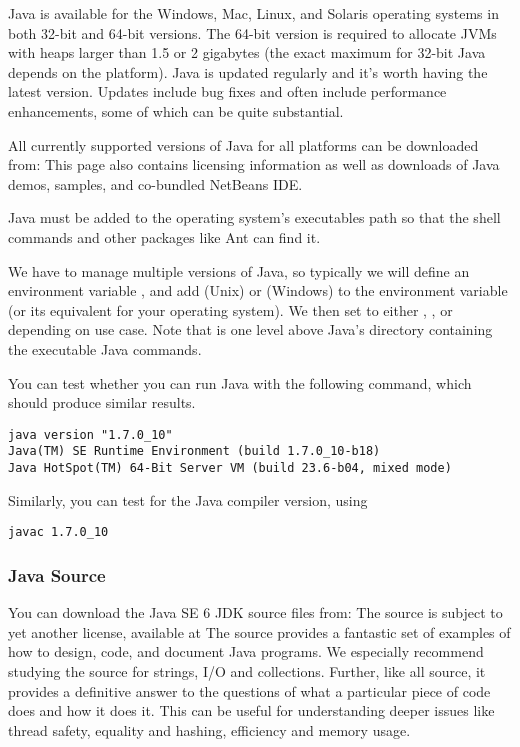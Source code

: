 Java is available for the Windows, Mac, Linux, and Solaris operating
systems in both 32-bit and 64-bit versions.
The 64-bit version
is required to allocate JVMs with heaps larger than 1.5 or 2 gigabytes
(the exact maximum for 32-bit Java depends on the platform).  
Java is updated regularly and it's worth having the latest version.
Updates include bug fixes and often include performance enhancements,
some of which can be quite substantial.

All currently supported versions of Java for all platforms can be downloaded from:
%
%
This page also contains licensing information as well as downloads of
Java demos, samples, and co-bundled NetBeans IDE.

Java must be added to the operating system's executables path so
that the shell commands and other packages like Ant can find it.

We have to manage multiple versions of Java, so typically we will
define an environment variable , and add
 (Unix) or
 (Windows) to the
 environment variable (or its equivalent for your
operating system).  We then set  to either
, , or 
depending on use case.  Note that  is one level
above Java's  directory containing the executable Java
commands.

You can test whether you can run Java with the following command, which
should produce similar results.
%
\begin{verbatim}
java version "1.7.0_10"
Java(TM) SE Runtime Environment (build 1.7.0_10-b18)
Java HotSpot(TM) 64-Bit Server VM (build 23.6-b04, mixed mode)
\end{verbatim}
%
Similarly, you can test for the Java compiler version, using
%
\begin{verbatim}
javac 1.7.0_10
\end{verbatim}


\subsubsection{Java Source}

You can download the Java SE 6 JDK source files from:
%
%
The source is subject to yet another license, available at
%
%
The source provides a fantastic set of examples of how to design,
code, and document Java programs.  We especially recommend studying
the source for strings, I/O and collections.  Further, like all
source, it provides a definitive answer to the questions of what a
particular piece of code does and how it does it.  This can be useful
for understanding deeper issues like thread safety, equality and
hashing, efficiency and memory usage.


